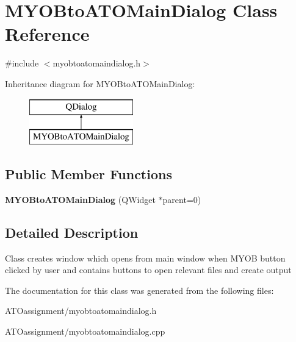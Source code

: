 \hypertarget{class_m_y_o_bto_a_t_o_main_dialog}{}\section{M\+Y\+O\+Bto\+A\+T\+O\+Main\+Dialog Class Reference}
\label{class_m_y_o_bto_a_t_o_main_dialog}


{\ttfamily \#include $<$myobtoatomaindialog.\+h$>$}

Inheritance diagram for M\+Y\+O\+Bto\+A\+T\+O\+Main\+Dialog\+:\begin{figure}[H]
\begin{center}
\leavevmode
\includegraphics[height=2.000000cm]{class_m_y_o_bto_a_t_o_main_dialog}
\end{center}
\end{figure}
\subsection*{Public Member Functions}
\begin{DoxyCompactItemize}
\item 
\hypertarget{class_m_y_o_bto_a_t_o_main_dialog_a762700abdbd63aed2b7afc29bdb235a3}{}\label{class_m_y_o_bto_a_t_o_main_dialog_a762700abdbd63aed2b7afc29bdb235a3} 
{\bfseries M\+Y\+O\+Bto\+A\+T\+O\+Main\+Dialog} (Q\+Widget $\ast$parent=0)
\end{DoxyCompactItemize}


\subsection{Detailed Description}
Class creates window which opens from main window when M\+Y\+OB button clicked by user and contains buttons to open relevant files and create output 

The documentation for this class was generated from the following files\+:\begin{DoxyCompactItemize}
\item 
A\+T\+Oassignment/myobtoatomaindialog.\+h\item 
A\+T\+Oassignment/myobtoatomaindialog.\+cpp\end{DoxyCompactItemize}
